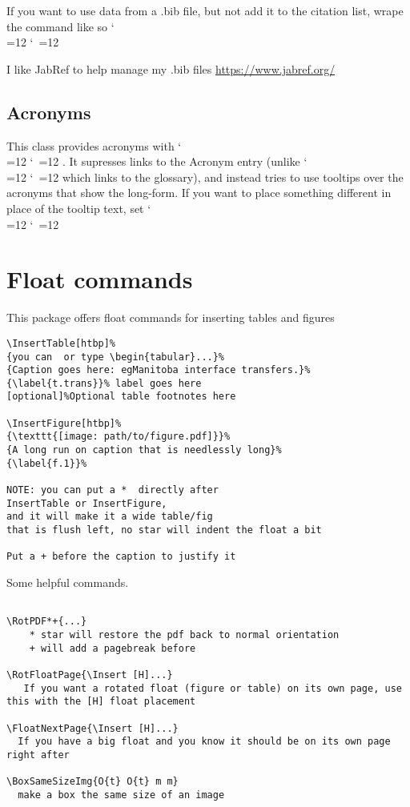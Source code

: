 \documentclass{\FormatDir corpboreportMulti}
\def\cmd{\bgroup\catcode`\\=12 \catcode`\ =12 \cmdA}
\def\cmdA#1{\egroup{\texttt{\detokenize{#1}}}}
\begin{document}
If you want to use data from a .bib file, but not add it to the citation list, wrape the command like so
\cmd{\begin{refsection}\fullcite{#1}\end{refsection}}

I like JabRef to help manage my .bib files \url{https://www.jabref.org/}


\subsection{Acronyms}

This class provides acronyms with \cmd{\ac}. It supresses links to the Acronym entry
(unlike \cmd{\gls{}} which links to the glossary), and instead
tries to use tooltips over the acronyms that show the long-form.
If you want to place something different in place of the tooltip text, set
\cmd{\def\ackeyToolTipText{Text Shown On Tooltip For: ackey}}



\section{Float commands}

This package offers float commands for inserting tables and figures

\begin{lstlisting}
\InsertTable[htbp]%
{you can  or type \begin{tabular}...}%
{Caption goes here: egManitoba interface transfers.}%
{\label{t.trans}}% label goes here
[optional]%Optional table footnotes here

\InsertFigure[htbp]%
{\texttt{[image: path/to/figure.pdf]}}%
{A long run on caption that is needlessly long}%
{\label{f.1}}%

NOTE: you can put a *  directly after
InsertTable or InsertFigure,
and it will make it a wide table/fig
that is flush left, no star will indent the float a bit

Put a + before the caption to justify it
\end{lstlisting}


Some helpful commands.

\begin{lstlisting}

\RotPDF*+{...}
	* star will restore the pdf back to normal orientation
	+ will add a pagebreak before

\RotFloatPage{\Insert [H]...}
   If you want a rotated float (figure or table) on its own page, use this with the [H] float placement

\FloatNextPage{\Insert [H]...}
  If you have a big float and you know it should be on its own page right after

\BoxSameSizeImg{O{t} O{t} m m}
  make a box the same size of an image
\end{lstlisting}
\end{document}
